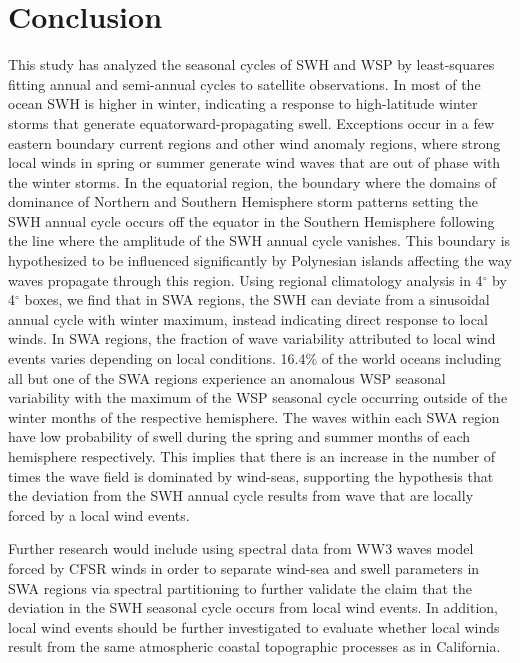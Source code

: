 \documentclass[draft,linenumbers]{agujournal2018}
\begin{document}
\section{Conclusion}

This study has analyzed the seasonal cycles of SWH and WSP by least-squares fitting annual and semi-annual cycles to satellite observations. In most of the ocean SWH is higher in winter, indicating a response to high-latitude winter storms that generate equatorward-propagating swell. Exceptions occur in a few eastern boundary current regions and other wind anomaly regions, where strong local winds in spring or summer generate wind waves that are out of phase with the winter storms. In the equatorial region, the boundary where the domains of dominance of Northern and Southern Hemisphere storm patterns setting the SWH annual cycle occurs off the equator in the Southern Hemisphere following the line where the amplitude of the SWH annual cycle vanishes. This boundary is hypothesized to be influenced significantly by Polynesian islands affecting the way waves propagate through this region. Using regional climatology analysis in 4$^{\circ}$ by 4$^{\circ}$ boxes, we find that in SWA regions, the SWH can deviate from a sinusoidal annual cycle with winter maximum, instead indicating direct response to local winds. In SWA regions, the fraction of wave variability attributed to local wind events varies depending on local conditions. 16.4\% of the world oceans including all but one of the SWA regions experience an anomalous WSP seasonal variability with the maximum of the WSP seasonal cycle occurring outside of the winter months of the respective hemisphere. The waves within each SWA region have low probability of swell during the spring and summer months of each hemisphere respectively. This implies that there is an increase in the number of times the wave field is dominated by wind-seas, supporting the hypothesis that the deviation from the SWH annual cycle results from wave that are locally forced by a local wind events.

Further research would include using spectral data from WW3 waves model forced by CFSR winds in order to separate wind-sea and swell parameters in SWA regions via spectral partitioning \cite{portilla2009spectral} to further validate the claim that the deviation in the SWH seasonal cycle occurs from local wind events. In addition, local wind events should be further investigated to evaluate whether local winds result from the same atmospheric coastal topographic processes as in California. 
\end{document}
